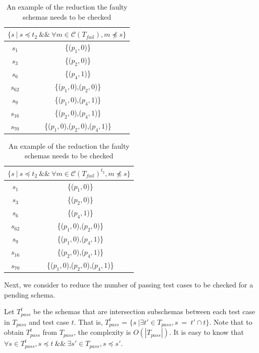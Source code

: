\begin{table}[htbp]
  \centering
  \caption{An example of the reduction the faulty schemas needs to be checked}
  \label{ex:mfssintequal}
    \begin{tabular}{|c|c|} \hline
     \multicolumn{2}{|c|}{$\{ s\ |\ s \preceq t_{2}\ \&\&\ \forall m \in \mathcal{C}(T_{fail}),  m \npreceq s \}$} \\ \hline
   $s_{1}$ & \{($p_{1}, 0$)\} \\
   $s_{3}$ & \{($p_{2}, 0$)\} \\
   $s_{6}$ & \{($p_{4}, 1$)\} \\

   $s_{62}$ & \{($p_{1}, 0$),($p_{2}, 0$)\} \\
   $s_{9}$ & \{($p_{1}, 0$),($p_{4}, 1$)\} \\
   $s_{16}$ & \{($p_{2}, 0$),($p_{4}, 1$)\} \\

   $s_{70}$ & \{($p_{1}, 0$),($p_{2}, 0$),($p_{4}, 1$)\} \\ \hline
    \end{tabular}%
\quad
    \begin{tabular}{|c|c|} \hline
   \multicolumn{2}{|c|}{$\{ s\ |\ s \preceq t_{2}\ \&\&\ \forall m \in \mathcal{C}(T_{fail})^{t_{2}},  m \npreceq s \}$}\\ \hline
   $s_{1}$ & \{($p_{1}, 0$)\} \\
   $s_{3}$ & \{($p_{2}, 0$)\} \\
   $s_{6}$ & \{($p_{4}, 1$)\} \\
   $s_{62}$ & \{($p_{1}, 0$),($p_{2}, 0$)\} \\
   $s_{9}$ & \{($p_{1}, 0$),($p_{4}, 1$)\} \\
   $s_{16}$ & \{($p_{2}, 0$),($p_{4}, 1$)\} \\
   $s_{70}$ & \{($p_{1}, 0$),($p_{2}, 0$),($p_{4}, 1$)\} \\ \hline
    \end{tabular}%
\end{table}



Next, we consider to reduce the number of passing test cases to be checked for a pending schema.

Let $T_{pass}^{t}$ be the schemas that are intersection subschemas between each test case in $T_{pass}$ and test case $t$. That is, $T_{pass}^{t}$ = $\{ s\ | \exists t' \in  T_{pass}, s\ =\ t' \cap t \}$. Note that to obtain $T_{pass}^{t}$ from $T_{pass}$, the complexity is $O(|T_{pass}|)$.  It is easy to know that $\forall s \in T_{pass}^{t}, s \preceq t \ \&\& \ \exists s' \in T_{pass}, s \preceq s'$.


